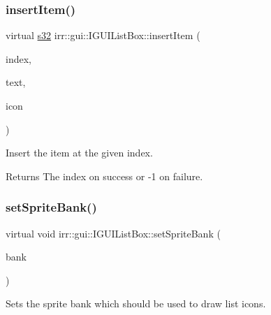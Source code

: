 \subsubsection{\texorpdfstring{insert\+Item()}{insertItem()}\hspace{0.1cm}{\footnotesize\ttfamily [2/2]}}
{\footnotesize\ttfamily virtual \hyperlink{namespaceirr_ac66849b7a6ed16e30ebede579f9b47c6}{s32} irr\+::gui\+::\+I\+G\+U\+I\+List\+Box\+::insert\+Item (\begin{DoxyParamCaption}\item[{\hyperlink{namespaceirr_a0416a53257075833e7002efd0a18e804}{u32}}]{index,  }\item[{const wchar\+\_\+t $\ast$}]{text,  }\item[{\hyperlink{namespaceirr_ac66849b7a6ed16e30ebede579f9b47c6}{s32}}]{icon }\end{DoxyParamCaption})\hspace{0.3cm}{\ttfamily [pure virtual]}}



Insert the item at the given index. 

\begin{DoxyReturn}{Returns}
The index on success or -\/1 on failure. 
\end{DoxyReturn}
\mbox{\label{classirr_1_1gui_1_1IGUIListBox_ad139cef6f71bb8d36624b48e8a695ed4}} 
\subsubsection{\texorpdfstring{set\+Sprite\+Bank()}{setSpriteBank()}\hspace{0.1cm}{\footnotesize\ttfamily [1/2]}}
{\footnotesize\ttfamily virtual void irr\+::gui\+::\+I\+G\+U\+I\+List\+Box\+::set\+Sprite\+Bank (\begin{DoxyParamCaption}\item[{\hyperlink{classirr_1_1gui_1_1IGUISpriteBank}{I\+G\+U\+I\+Sprite\+Bank} $\ast$}]{bank }\end{DoxyParamCaption})\hspace{0.3cm}{\ttfamily [pure virtual]}}



Sets the sprite bank which should be used to draw list icons. 

